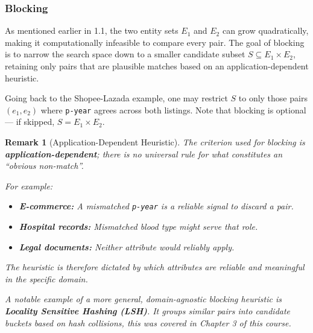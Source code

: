 \documentclass[11pt, a4paper]{article}
\theoremstyle{boxed}
\newtheorem{innerremark}{Remark}[section]
\newenvironment{remark}
  {\begin{mdframed}[style=notestyle]\begin{innerremark}}
  {\end{innerremark}\end{mdframed}}
\begin{document}
\subsubsection{Blocking}
As mentioned earlier in 1.1, the two entity sets $E_1$ and $E_2$ can grow quadratically, making it computationally infeasible to compare every pair. The goal of blocking is to narrow the search space down to a smaller candidate subset $S \subseteq E_1 \times E_2$, retaining only pairs that are plausible matches based on an application-dependent heuristic.

Going back to the Shopee-Lazada example, one may restrict $S$ to only those pairs $(e_1, e_2)$ where \texttt{p-year} agrees across both listings. Note that blocking is optional --- if skipped, $S = E_1 \times E_2$.

\begin{remark}[Application-Dependent Heuristic]

\begin{sloppypar}
The criterion used for blocking is \textbf{application-dependent}; there is no universal rule for what constitutes an ``obvious non-match''.
\end{sloppypar}
  For example:
  \begin{itemize}
    \item \textbf{E-commerce:} A mismatched \texttt{p-year} is a reliable signal to discard a pair.
    \item \textbf{Hospital records:} Mismatched blood type might serve that role.
    \item \textbf{Legal documents:} Neither attribute would reliably apply.
  \end{itemize}
  The heuristic is therefore dictated by which attributes are reliable and meaningful in the specific domain.

  A notable example of a more general, domain-agnostic blocking heuristic is
  \textbf{Locality Sensitive Hashing (LSH)}. It groups similar pairs into candidate buckets based on hash collisions, this was covered in Chapter 3 of this course.
\end{remark}
\end{document}
